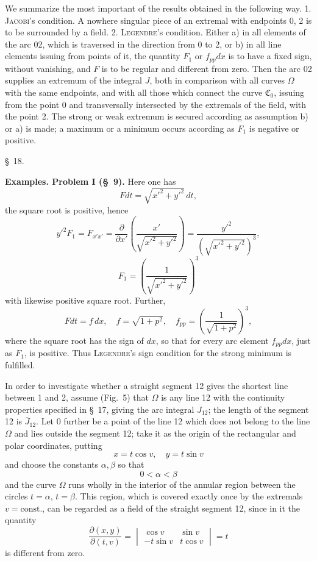 \documentclass[11pt,a4paper,leqno]{article}
\begin{document}
We summarize the most important of the results obtained in the following way. 1. \textsc{Jacobi}'s condition. A nowhere singular piece of an extremal with endpoints 0, 2 is to be surrounded by a field. 2. \textsc{Legendre}'s condition. Either a) in all elements of the arc 02, which is traversed in the direction from 0 to 2, or b) in all line elements issuing from points of it, the quantity $F_1$ or $f_{pp}dx$ is to have a fixed sign, without vanishing, and $F$ is to be regular and different from zero. Then the arc 02 supplies an extremum of the integral $J$, both in comparison with all curves $\Omega$ with the same endpoints, and with all those which connect the curve $\mathfrak{C}_0$, issuing from the point 0 and transversally intersected by the extremals of the field, with the point 2. The strong or weak extremum is secured according as assumption b) or a) is made; a maximum or a minimum occurs according as $F_1$ is negative or positive.

\begin{center}{\large \S~18.}\end{center}

\noindent\textbf{Examples. Problem I (\S~9).} Here one has
\[
Fdt=\sqrt{x'^2+y'^2}\,dt,
\]
the square root is positive, hence
\[
y'^2F_1=F_{x'x'}=\frac{\partial}{\partial x'}
\left(\frac{x'}{\sqrt{x'^2+y'^2}}\right)
=\frac{y'^2}{\left(\sqrt{x'^2+y'^2}\right)^3},
\]
\[
F_1=\left(\frac{1}{\sqrt{x'^2+y'^2}}\right)^3
\]
with likewise positive square root. Further,
\[
Fdt=f\,dx,\quad f=\sqrt{1+p^2},\quad
f_{pp}=\left(\frac{1}{\sqrt{1+p^2}}\right)^3,
\]
where the square root has the sign of $dx$, so that for every arc element $f_{pp}dx$, just as $F_1$, is positive. Thus \textsc{Legendre}'s sign condition for the strong minimum is fulfilled.

In order to investigate whether a straight segment 12 gives the shortest line between 1 and 2, assume (Fig.~5) that $\Omega$ is any line 12 with the continuity properties specified in \S~17, giving the arc integral $J_{12}$; the length
of the segment 12 is $\overline{J}_{12}$. Let 0 further be a point of the line 12 which does not belong to the line $\Omega$ and lies outside the segment 12; take it as the origin of the rectangular and polar coordinates, putting
\[
x=t\cos v,\quad y=t\sin v
\]
and choose the constants $\alpha,\beta$ so that
\[
0<\alpha<\beta
\]
and the curve $\Omega$ runs wholly in the interior of the annular region between the circles $t=\alpha$, $t=\beta$. This region, which is covered exactly once by the extremals $v=\text{const.}$, can be regarded as a field of the straight segment 12, since in it the quantity
\[
\frac{\partial(x,y)}{\partial(t,v)}
=
\begin{vmatrix}
\cos v & \sin v\\
-t\sin v & t\cos v
\end{vmatrix}
=t
\]
is different from zero.
\end{document}
